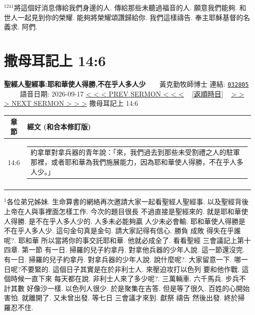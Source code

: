 \documentclass{book}
\begin{document}
$^{1241}$將這個好消息傳給我們身邊的人.
傳給那些未聽過福音的人.
願意我們能夠.
和世人一起見到你的榮耀.
能夠將榮耀頌讚歸給你.
我們這樣禱告.
奉主耶穌基督的名義求.
阿們.
\newpage



\section{撒母耳記上 14:6}
\label{sec:032805}
\textbf{聖經人聖經事:耶和華使人得勝,不在乎人多人少}~~~~黃克勤牧師博士
\newline
\newline
連結: \href{http://www.church.com.hk/acms/content.asp?site=cdc\&op=show\&type=product\&code=032805\&layout=sermon}{\texttt{032805}} ~~~~ 語音日期: 2026-09-17
\newline
\newline
\hyperref[sec:032804]{\small{< < < PREV SERMON < < <}}
~
\hyperref[sec:index_chronic]{\small{[返順時目]}}
~
\hyperref[sec:032806]{\small{> > > NEXT SERMON > > >}}
\newline
\newline
撒母耳記上 14:6
\newline
\begin{longtable}{cl}
\hline
\hline
章節 & 經文 (和合本修訂版)\\
\hline
14:6 & \begin{tabularx}{0.7\textwidth}{X} 約拿單對拿兵器的青年說：「來，我們過去到那些未受割禮之人的駐軍那裡，或者耶和華為我們施展能力，因為耶和華使人得勝，不在乎人多人少。」 \end{tabularx} \\ \\
[1ex]
\hline
\hline
\end{longtable}
$^{1}$各位弟兄姊妹.
生命算書的網絡再次邀請大家一起看聖經人聖經事.
以及聖經背後上帝在人與事裡面怎樣工作.
今次的題目很長 不過直接是聖經來的.
就是耶和華使人得勝.
是不在乎人多人少的.
人多未必能夠贏 人少未必會輸.
耶和華使人得勝是不在乎人多人少.
這句金句真是金句.
請大家記得有信心.
勝負 成敗 得失在乎誰呢?.
耶和華 所以當將你的事交託耶和華.
他就必成全了.
看看聖經 三會議記上第十四章.
第一節 有一日.
掃羅的兒子約拿丹.
對拿他兵器的少年人說.
這一節還沒完.
有一日.
掃羅的兒子約拿丹.
對拿兵器的少年人說.
說什麼呢?.
大家留意一下.
哪一日呢?不要緊的.
這個日子其實是在於非利士人.
來壓迫攻打以色列 要和他作戰.
這個時候一直下來 每天都在說.
非利士人來了多少呢?.
三萬輛車.
六千馬兵.
步兵不計其數 好像沙一樣.
以色列人很少.
於是聚集在吉答.
但是等了很久.
百姓的心開始害怕.
就離開了.
又未曾出發.
等七日 三會議才來到.
獻祭 禱告 然後出發.
終於掃羅忍不住.
\end{document}
